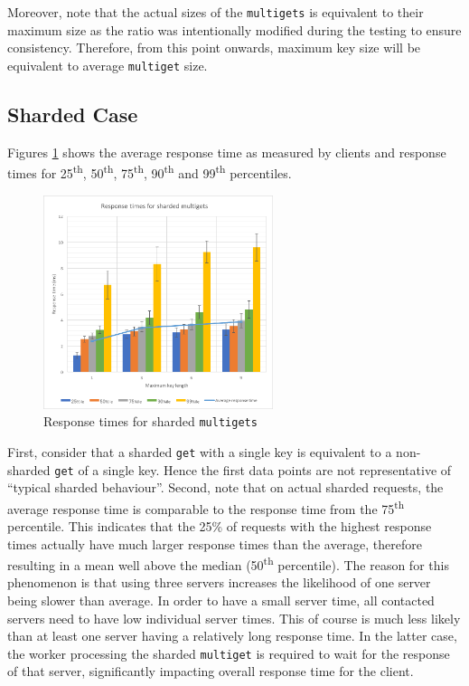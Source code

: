 \documentclass[11pt,a4paper]{article}
\begin{document}
Moreover, note that the actual sizes of the \texttt{multigets} is equivalent to their maximum size as the ratio was intentionally modified during the testing to ensure consistency. Therefore, from this point onwards, maximum key size will be equivalent to average \texttt{multiget} size.

\subsection{Sharded Case}
Figures \ref{png::get_and_multigets_latency-keylen_sharded} shows the average response time as measured by clients and response times for 25\textsuperscript{th}, 50\textsuperscript{th}, 75\textsuperscript{th}, 90\textsuperscript{th} and 99\textsuperscript{th} percentiles.

\begin{figure}[!h]
    \centering
    \includegraphics[width=0.6\textwidth]{processing/graphics/get_and_multigets_latency-keylen_sharded.png}
    \caption{Response times for sharded \texttt{multigets}}
    \label{png::get_and_multigets_latency-keylen_sharded}
\end{figure}

First, consider that a sharded \texttt{get} with a single key is equivalent to a non-sharded \texttt{get} of a single key. Hence the first data points are not representative of ``typical sharded behaviour''. Second, note that on actual sharded requests, the average response time is comparable to the response time from the 75\textsuperscript{th} percentile. This indicates that the 25\% of requests with the highest response times actually have much larger response times than the average, therefore resulting in a mean well above the median (50\textsuperscript{th} percentile). The reason for this phenomenon is that using three servers increases the likelihood of one server being slower than average.  In order to have a small server time, all contacted servers need to have low individual server times. This of course is much less likely than at least one server having a relatively long response time. In the latter case, the worker processing the sharded \texttt{multiget} is required to wait for the response of that server, significantly impacting overall response time for the client.
\end{document}
